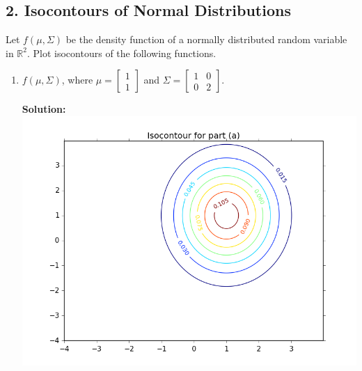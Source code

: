 \documentclass{article}
\newcommand{\solution}{\textbf{Solution: }}
\newcommand{\R}{\mathbb{R}}
\begin{document}
\subsection*{2. Isocontours of Normal Distributions}
Let $f(\mu, \Sigma)$ be the density function of a normally distributed random variable in $\R^2$. Plot isocontours of the following functions.
\begin{enumerate}[label=(\alph*)]
    \item $f(\mu, \Sigma)$, where $\mu = \begin{bmatrix}1 \\ 1 \end{bmatrix}$ and $\Sigma = \begin{bmatrix} 1 & 0  \\ 0 & 2 \end{bmatrix}$. 
    \begin{mdframed} \solution\\
    \includegraphics[scale=.75]{images/isocontour_a.png}
    \end{mdframed}
    

\end{enumerate}
\end{document}

